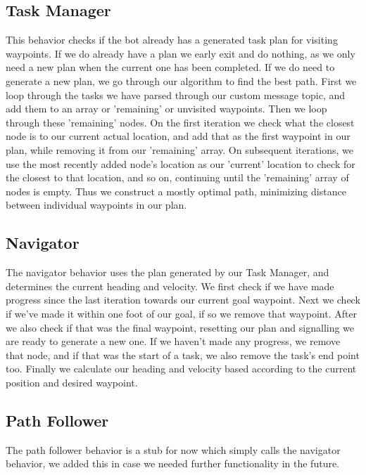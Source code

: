 \documentclass[12pt]{article}
\begin{document}
\subsection{Task Manager}
This behavior checks if the bot already has a generated task plan for visiting waypoints. If we do already have a plan we early exit and do nothing, as we only need a new plan when the current one has been completed. If we do need to generate a new plan, we go through our algorithm to find the best path. First we loop through the tasks we have parsed through our custom message topic, and add them to an array or 'remaining' or unvisited waypoints. Then we loop through these 'remaining' nodes. On the first iteration we check what the closest node is to our current actual location, and add that as the first waypoint in our plan, while removing it from our 'remaining' array. On subsequent iterations, we use the most recently added node's location as our 'current' location to check for the closest to that location, and so on, continuing until the 'remaining' array of nodes is empty. Thus we construct a mostly optimal path, minimizing distance between individual waypoints in our plan.

\subsection{Navigator}
The navigator behavior uses the plan generated by our Task Manager, and determines the current heading and velocity. We first check if we have made progress since the last iteration towards our current goal waypoint. Next we check if we've made it within one foot of our goal, if so we remove that waypoint. After we also check if that was the final waypoint, resetting our plan and signalling we are ready to generate a new one. If we haven't made any progress, we remove that node, and if that was the start of a task, we also remove the task's end point too. Finally we calculate our heading and velocity based according to the current position and desired waypoint.

\subsection{Path Follower}
The path follower behavior is a stub for now which simply calls the navigator behavior, we added this in case we needed further functionality in the future.
\end{document}
